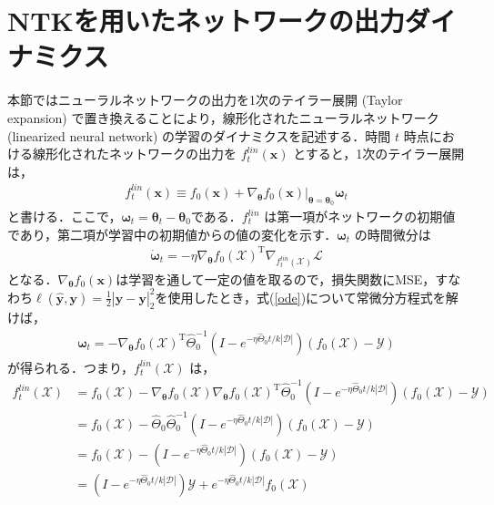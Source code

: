 \section{NTKを用いたネットワークの出力ダイナミクス}
\label{NTK_dynamics}
本節ではニューラルネットワークの出力を1次のテイラー展開 (Taylor expansion) で置き換えることにより，線形化されたニューラルネットワーク (linearized neural network) の学習のダイナミクスを記述する．時間 $t$ 時点における線形化されたネットワークの出力を $f_t^{lin}(\bm{x})$ とすると，1次のテイラー展開は，
\begin{align}
    f_t^{lin}(\bm{x}) \equiv f_0(\bm{x}) + \nabla_{\bm{\theta}}f_0(\bm{x})|_{\bm{\theta}=\bm{\theta}_0}\bm{\omega}_t \label{f_t_lin}
\end{align}
と書ける．ここで，$\bm{\omega}_t=\bm{\theta}_t - \bm{\theta}_0$である．$f_t^{lin}$ は第一項がネットワークの初期値であり，第二項が学習中の初期値からの値の変化を示す．$\bm{\omega}_t$ の時間微分は
\begin{align}
    \dot{\bm{\omega}}_t = -\eta \nabla_{\bm{\theta}}f_0(\mathcal{X})^{\mathrm{T}}\nabla_{f_t^{lin}(\mathcal{X})}\mathcal{L} \label{ode}
\end{align}
となる．$\nabla_{\bm{\theta}}f_0(\bm{x})$は学習を通して一定の値を取るので，損失関数にMSE，すなわち$\ell(\hat{\bm{y}},\bm{y}) = \frac{1}{2}|\hat{\bm{y}}-\bm{y}|_2^2$を使用したとき，式(\ref{ode})について常微分方程式を解けば，
\begin{align}
    \bm{\omega}_t = -\nabla_{\bm{\theta}}f_0(\mathcal{X})^{\mathrm{T}}\hat{\Theta}_{0}^{-1}\left(I - e^{-\eta\hat{\Theta}_0 t/k|\mathcal{D}|}\right)(f_0(\mathcal{X})- \mathcal{Y})
\end{align}
が得られる．つまり，$f_t^{lin}(\mathcal{X})$ は，
\begin{align}
    f_t^{lin}(\mathcal{X}) &= f_0(\mathcal{X}) - \nabla_{\bm{\theta}}f_0(\mathcal{X})\nabla_{\bm{\theta}}f_0(\mathcal{X})^{\mathrm{T}}\hat{\Theta}_{0}^{-1}\left(I - e^{-\eta\hat{\Theta}_0 t/k|\mathcal{D}|}\right)(f_0(\mathcal{X})- \mathcal{Y}) \\
    &= f_0(\mathcal{X}) - \hat{\Theta}_0 \hat{\Theta}_0^{-1}\left(I - e^{-\eta\hat{\Theta}_0 t/k|\mathcal{D}|}\right)(f_0(\mathcal{X})- \mathcal{Y}) \\
    &= f_0(\mathcal{X}) - \left(I - e^{-\eta\hat{\Theta}_0 t/k|\mathcal{D}|}\right)(f_0(\mathcal{X})- \mathcal{Y}) \\
    &= \left(I - e^{-\eta\hat{\Theta}_0 t/k|\mathcal{D}|}\right)\mathcal{Y} + e^{-\eta\hat{\Theta}_0 t/k|\mathcal{D}|}f_0(\mathcal{X}) \label{ntk_output}
\end{align}
